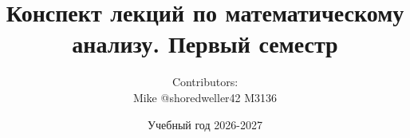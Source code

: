 

\title{\huge\textbf{Конспект лекций по математическому анализу. Первый семестр}}
\author{\large Contributors: \\ Mike @shoredweller42 M3136}
\date{Учебный год 2026-2027}


	
	\maketitle
	\tableofcontents
	\newpage
	
	
	


